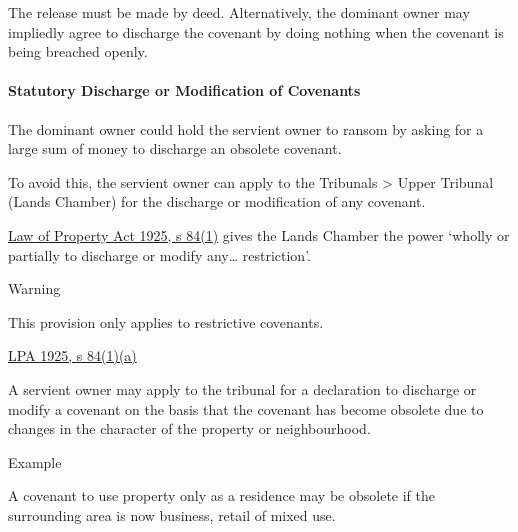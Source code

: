 \documentclass[
]{article}
\newenvironment{env-9843ce55-0506-497d-95ba-03a690b05b3c}
{
    \savenotes\tcolorbox[blanker,breakable,left=5pt,borderline west={2pt}{-4pt}{green}]
}
{
    \endtcolorbox\spewnotes
}
\newenvironment{env-7ede146d-a28c-46fa-985d-64c388b7528b}
{
    \savenotes\tcolorbox[blanker,breakable,left=5pt,borderline west={2pt}{-4pt}{orange}]
}
{
    \endtcolorbox\spewnotes
}
\newenvironment{env-de3101d4-f08b-48eb-bc0e-2fa06f3bcf8e}
{
    \savenotes\tcolorbox[blanker,breakable,left=5pt,borderline west={2pt}{-4pt}{purple}]
}
{
    \endtcolorbox\spewnotes
}
\begin{document}
The release must be made by deed. Alternatively, the dominant owner may
impliedly agree to discharge the covenant by doing nothing when the
covenant is being breached openly.

\hypertarget{statutory-discharge-or-modification-of-covenants}{%
\paragraph{Statutory Discharge or Modification of
Covenants}\label{statutory-discharge-or-modification-of-covenants}}

The dominant owner could hold the servient owner to ransom by asking for
a large sum of money to discharge an obsolete covenant.

To avoid this, the servient owner can apply to the Tribunals
\textgreater{} Upper Tribunal (Lands Chamber) for the discharge or
modification of any covenant.

\href{https://www.legislation.gov.uk/ukpga/Geo5/15-16/20/section/84}{Law
of Property Act 1925, s 84(1)} gives the Lands Chamber the power `wholly
or partially to discharge or modify any\ldots{} restriction'.

\begin{env-7ede146d-a28c-46fa-985d-64c388b7528b}

Warning

This provision only applies to restrictive covenants.

\end{env-7ede146d-a28c-46fa-985d-64c388b7528b}

\begin{env-9843ce55-0506-497d-95ba-03a690b05b3c}

\href{https://www.legislation.gov.uk/ukpga/Geo5/15-16/20/section/84}{LPA
1925, s 84(1)(a)}

A servient owner may apply to the tribunal for a declaration to
discharge or modify a covenant on the basis that the covenant has become
obsolete due to changes in the character of the property or
neighbourhood.

\end{env-9843ce55-0506-497d-95ba-03a690b05b3c}

\begin{env-de3101d4-f08b-48eb-bc0e-2fa06f3bcf8e}

Example

A covenant to use property only as a residence may be obsolete if the
surrounding area is now business, retail of mixed use.

\end{env-de3101d4-f08b-48eb-bc0e-2fa06f3bcf8e}
\end{document}
